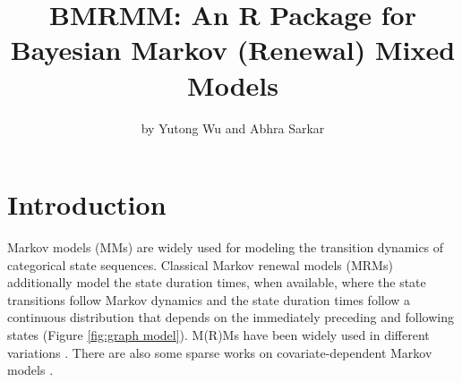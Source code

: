 \title{BMRMM: An R Package for Bayesian Markov (Renewal) Mixed Models}
\author{by Yutong Wu and Abhra Sarkar}

\maketitle



\section[Introduction]{Introduction} \label{sec:intro}

Markov models (MMs) are widely used for modeling the transition dynamics of categorical state sequences. 
Classical Markov renewal models (MRMs) additionally model the state duration times, when available, 
where the state transitions follow Markov dynamics 
and the state duration times follow a continuous distribution that depends on the immediately preceding and following states (Figure \ref{fig:graph model}). 
M(R)Ms have been widely used in different variations 
\citep{phelan1990bayes,eichelsbacher2002bayesian,muliere2003reinforced,alvarez2005estimation,
diaconis2006bayesian,bulla2007bayesian,etterson2007analysis,bacallado2009bayesian,
li2009markov,epifani2014bayesian,siebert2016bayesian,holsclaw2017bayesian,sesia2019gene}. 
There are also some sparse works on covariate-dependent Markov models \citep{muenz1985markov,gradner1990analyzing,alioum1998effect,islam2006higher}.



